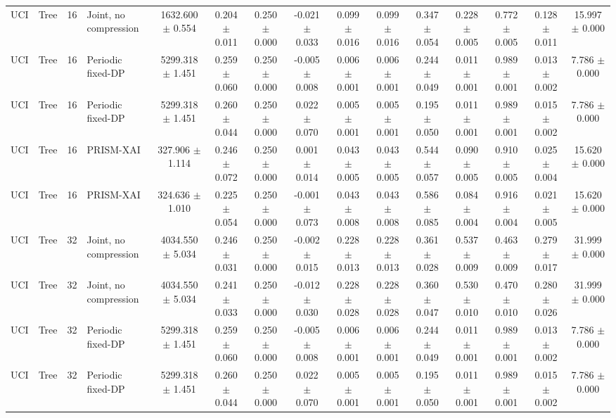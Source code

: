 \begin{table}[t]
\begin{tabular}{llllccccccccccc}
UCI & Tree & 16 & Joint, no compression & 1632.600 $\pm$ 0.554 & 0.204 $\pm$ 0.011 & 0.250 $\pm$ 0.000 & -0.021 $\pm$ 0.033 & 0.099 $\pm$ 0.016 & 0.099 $\pm$ 0.016 & 0.347 $\pm$ 0.054 & 0.228 $\pm$ 0.005 & 0.772 $\pm$ 0.005 & 0.128 $\pm$ 0.011 & 15.997 $\pm$ 0.000 \\
UCI & Tree & 16 & Periodic fixed-DP & 5299.318 $\pm$ 1.451 & 0.259 $\pm$ 0.060 & 0.250 $\pm$ 0.000 & -0.005 $\pm$ 0.008 & 0.006 $\pm$ 0.001 & 0.006 $\pm$ 0.001 & 0.244 $\pm$ 0.049 & 0.011 $\pm$ 0.001 & 0.989 $\pm$ 0.001 & 0.013 $\pm$ 0.002 & 7.786 $\pm$ 0.000 \\
UCI & Tree & 16 & Periodic fixed-DP & 5299.318 $\pm$ 1.451 & 0.260 $\pm$ 0.044 & 0.250 $\pm$ 0.000 & 0.022 $\pm$ 0.070 & 0.005 $\pm$ 0.001 & 0.005 $\pm$ 0.001 & 0.195 $\pm$ 0.050 & 0.011 $\pm$ 0.001 & 0.989 $\pm$ 0.001 & 0.015 $\pm$ 0.002 & 7.786 $\pm$ 0.000 \\
UCI & Tree & 16 & PRISM-XAI & 327.906 $\pm$ 1.114 & 0.246 $\pm$ 0.072 & 0.250 $\pm$ 0.000 & 0.001 $\pm$ 0.014 & 0.043 $\pm$ 0.005 & 0.043 $\pm$ 0.005 & 0.544 $\pm$ 0.057 & 0.090 $\pm$ 0.005 & 0.910 $\pm$ 0.005 & 0.025 $\pm$ 0.004 & 15.620 $\pm$ 0.000 \\
UCI & Tree & 16 & PRISM-XAI & 324.636 $\pm$ 1.010 & 0.225 $\pm$ 0.054 & 0.250 $\pm$ 0.000 & -0.001 $\pm$ 0.073 & 0.043 $\pm$ 0.008 & 0.043 $\pm$ 0.008 & 0.586 $\pm$ 0.085 & 0.084 $\pm$ 0.004 & 0.916 $\pm$ 0.004 & 0.021 $\pm$ 0.005 & 15.620 $\pm$ 0.000 \\
UCI & Tree & 32 & Joint, no compression & 4034.550 $\pm$ 5.034 & 0.246 $\pm$ 0.031 & 0.250 $\pm$ 0.000 & -0.002 $\pm$ 0.015 & 0.228 $\pm$ 0.013 & 0.228 $\pm$ 0.013 & 0.361 $\pm$ 0.028 & 0.537 $\pm$ 0.009 & 0.463 $\pm$ 0.009 & 0.279 $\pm$ 0.017 & 31.999 $\pm$ 0.000 \\
UCI & Tree & 32 & Joint, no compression & 4034.550 $\pm$ 5.034 & 0.241 $\pm$ 0.033 & 0.250 $\pm$ 0.000 & -0.012 $\pm$ 0.030 & 0.228 $\pm$ 0.028 & 0.228 $\pm$ 0.028 & 0.360 $\pm$ 0.047 & 0.530 $\pm$ 0.010 & 0.470 $\pm$ 0.010 & 0.280 $\pm$ 0.026 & 31.999 $\pm$ 0.000 \\
UCI & Tree & 32 & Periodic fixed-DP & 5299.318 $\pm$ 1.451 & 0.259 $\pm$ 0.060 & 0.250 $\pm$ 0.000 & -0.005 $\pm$ 0.008 & 0.006 $\pm$ 0.001 & 0.006 $\pm$ 0.001 & 0.244 $\pm$ 0.049 & 0.011 $\pm$ 0.001 & 0.989 $\pm$ 0.001 & 0.013 $\pm$ 0.002 & 7.786 $\pm$ 0.000 \\
UCI & Tree & 32 & Periodic fixed-DP & 5299.318 $\pm$ 1.451 & 0.260 $\pm$ 0.044 & 0.250 $\pm$ 0.000 & 0.022 $\pm$ 0.070 & 0.005 $\pm$ 0.001 & 0.005 $\pm$ 0.001 & 0.195 $\pm$ 0.050 & 0.011 $\pm$ 0.001 & 0.989 $\pm$ 0.001 & 0.015 $\pm$ 0.002 & 7.786 $\pm$ 0.000 \\

\end{tabular}
\end{table}
